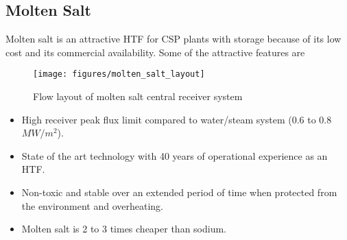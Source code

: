 \subsection{Molten Salt}
\noindent Molten salt is an attractive HTF for CSP plants with storage because of its low cost and its commercial availability. Some of the attractive features \cite{Falcone.1986} are
\begin{figure}[h!]
	\texttt{[image: figures/molten\_salt\_layout]}
	\centering
	\caption{Flow layout of molten salt central receiver system \cite{Wagner.2008}}
\end{figure}
\begin{itemize}
\item High receiver peak flux limit compared to water/steam system (0.6 to 0.8 $MW/m^2$).
\item State of the art technology with 40 years of operational experience as an HTF. 
\item Non-toxic and stable over an extended period of time when protected from the environment and overheating. 
\item Molten salt is 2 to 3 times cheaper than sodium.
\end{itemize}
